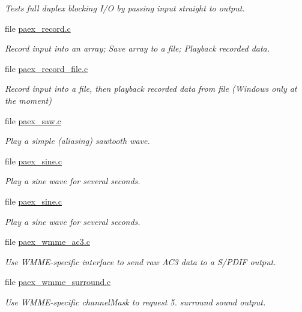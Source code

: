 \begin{DoxyCompactItemize}
\begin{DoxyCompactList}\small\item\em Tests full duplex blocking I/O by passing input straight to output. \end{DoxyCompactList}\item 
file \hyperlink{paex__record_8c}{paex\+\_\+record.\+c}
\begin{DoxyCompactList}\small\item\em Record input into an array; Save array to a file; Playback recorded data. \end{DoxyCompactList}\item 
file \hyperlink{paex__record__file_8c}{paex\+\_\+record\+\_\+file.\+c}
\begin{DoxyCompactList}\small\item\em Record input into a file, then playback recorded data from file (Windows only at the moment) \end{DoxyCompactList}\item 
file \hyperlink{paex__saw_8c}{paex\+\_\+saw.\+c}
\begin{DoxyCompactList}\small\item\em Play a simple (aliasing) sawtooth wave. \end{DoxyCompactList}\item 
file \hyperlink{paex__sine_8c}{paex\+\_\+sine.\+c}
\begin{DoxyCompactList}\small\item\em Play a sine wave for several seconds. \end{DoxyCompactList}\item 
file \hyperlink{paex__sine_8c}{paex\+\_\+sine.\+c}
\begin{DoxyCompactList}\small\item\em Play a sine wave for several seconds. \end{DoxyCompactList}\item 
file \hyperlink{paex__wmme__ac3_8c}{paex\+\_\+wmme\+\_\+ac3.\+c}
\begin{DoxyCompactList}\small\item\em Use W\+M\+M\+E-\/specific interface to send raw A\+C3 data to a S/\+P\+D\+IF output. \end{DoxyCompactList}\item 
file \hyperlink{paex__wmme__surround_8c}{paex\+\_\+wmme\+\_\+surround.\+c}
\begin{DoxyCompactList}\small\item\em Use W\+M\+M\+E-\/specific channel\+Mask to request 5. surround sound output. \end{DoxyCompactList}\item 

\end{DoxyCompactItemize}
